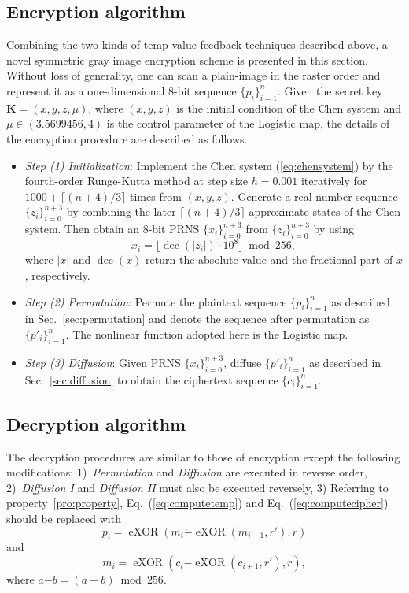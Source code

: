 \documentclass[3p,preprint,11pt]{elsarticle}
\DeclareMathOperator{\dec}{dec}
\DeclareMathOperator{\eXOR}{eXOR}
\begin{document}
\subsection{Encryption algorithm}
\label{sec:encryption}
Combining the two kinds of temp-value feedback techniques described above, a novel symmetric
gray image encryption scheme is presented in this section. Without loss of generality, one can
scan a plain-image in the raster order and represent it as a one-dimensional $8$-bit sequence
$\{p_i\}_{i=1}^n$. Given the secret key $\bm{K} = (x, y, z, \mu)$, where $(x, y, z)$ is the initial
condition of the Chen system and $\mu \in (3.5699456, 4)$ is the control parameter of the Logistic map, the details of the encryption procedure are described as follows.
\begin{itemize}
\item \textit{Step (1) Initialization}: Implement the Chen system (\ref{eq:chensystem})
by the fourth-order Runge-Kutta method at step size $h=0.001$ iteratively for
$1000+\lceil (n+4)/3 \rceil$ times from $(x, y, z)$. Generate a real number sequence $\{z_i\}_{i=0}^{n+3}$ by
combining the later $\lceil (n+4)/3 \rceil$ approximate states of the Chen system. Then obtain
an $8$-bit PRNS $\{x_i\}_{i=0}^{n+3}$ from $\{z_i\}_{i=0}^{n+3}$ by using
\begin{equation*}
x_i = \lfloor \dec( \left| z_i \right|)\cdot 10^8 \rfloor \bmod 256,
\end{equation*}
where $\left| x \right|$ and  $\dec(x)$ return the absolute value and the fractional part
of $x$, respectively.

\item \textit{Step (2) Permutation}: Permute the plaintext sequence $\{p_i\}_{i=1}^n$ as described in Sec.~\ref{sec:permutation} and denote the sequence after permutation as $\{p'_i\}_{i=1}^n$. The nonlinear
    function adopted here is the Logistic map.

\item \textit{Step (3) Diffusion}: Given PRNS $\{x_i\}_{i=0}^{n+3}$, diffuse $\{p'_i\}_{i=1}^n$
    as described in Sec.~\ref{sec:diffusion} to obtain the ciphertext sequence $\{c_i\}_{i=1}^n$.
\end{itemize}

\subsection{Decryption algorithm}
The decryption procedures are similar to those of encryption except the following modifications:
1)~\textit{Permutation} and \textit{Diffusion} are executed in reverse order,
2)~\textit{Diffusion I} and \textit{Diffusion II} must also be
executed reversely, 3) Referring to property~\ref{pro:property}, Eq.~(\ref{eq:computetemp}) and Eq.~(\ref{eq:computecipher}) should be replaced with
\begin{equation*}
    p_i = \eXOR(m_i \dot{-} \eXOR(m_{i-1},r'), r)
\end{equation*}
and
\begin{equation*}
    m_i = \eXOR(c_i \dot{-} \eXOR(c_{i+1},r'), r),
\end{equation*}
where $a \dot{-} b = (a-b) \bmod 256$.
\end{document}
